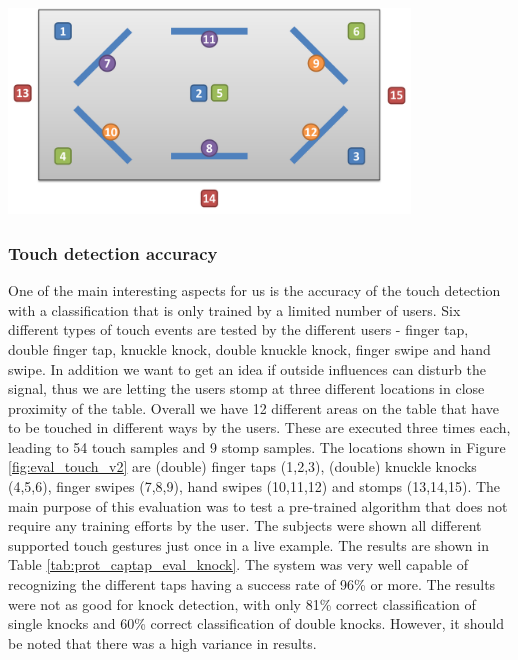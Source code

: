 \begin{minipage}{\linewidth}
\centering
\includegraphics[width=0.8\textwidth]{images/eval_touch_v2}
\label{fig:eval_touch_v2}
\end{minipage}

\subsubsection*{Touch detection accuracy}
One of the main interesting aspects for us is the accuracy of the touch detection with a classification that is only trained by a limited number of users. Six different types of touch events are tested by the different users - finger tap, double finger tap, knuckle knock, double knuckle knock, finger swipe and hand swipe. In addition we want to get an idea if outside influences can disturb the signal, thus we are letting the users stomp at three different locations in close proximity of the table. Overall we have 12 different areas on the table that have to be touched in different ways by the users. These are executed three times each, leading to 54 touch samples and 9 stomp samples. The locations shown in Figure \ref{fig:eval_touch_v2} are (double) finger taps (1,2,3), (double) knuckle knocks (4,5,6), finger swipes (7,8,9), hand swipes (10,11,12) and  stomps (13,14,15). The main purpose of this evaluation was to test a pre-trained algorithm that does not require any training efforts by the user. The subjects were shown all different supported touch gestures just once in a live example. The results are shown in Table \ref{tab:prot_captap_eval_knock}. The system was very well capable of recognizing the different taps having a success rate of 96\% or more. The results were not as good for knock detection, with only 81\% correct classification of single knocks and 60\% correct classification of double knocks. However, it should be noted that there was a high variance in results.
 
